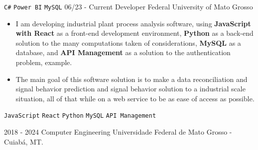 \documentclass[9pt]{developercv} %
\begin{document}
\begin{entrylist}
{        \texttt{C\#} \slashsep \texttt{Power BI} \slashsep \texttt{MySQL}}
        \entry
		{06/23 - Current}
		{\normalsize Developer}
		{\normalsize Federal University of Mato Grosso}
		{\vspace{-10pt}
        \vspace{2.5pt}
        \begin{itemize}[noitemsep,topsep=0pt,parsep=0pt,partopsep=0pt, leftmargin=-1pt]
            \item {I am developing industrial plant process analysis software, using \textbf{JavaScript with React} as a front-end development environment, \textbf{Python} as a back-end solution to the many computations taken of considerations, \textbf{MySQL} as a database, and \textbf{API Management} as a solution to the authentication problem, example.}
            \vspace{2.5pt}
            \item {The main goal of this software solution is to make a data reconciliation and signal behavior prediction and signal behavior solution to a industrial scale situation, all of that while on a web service to be as ease of access as possible.}
        \end{itemize} 
        \texttt{JavaScript} \slashsep \texttt{React} \slashsep \texttt{Python} \slashsep \texttt{MySQL} \slashsep \texttt{API Management}}
\end{entrylist}
\vspace{-10 pt}
\begin{entrylist}
    \entry
		{\normalsize 2018 - 2024}
		{\normalsize Computer Engineering}
		{\normalsize Universidade Federal de Mato Grosso - Cuiabá, MT.}
		{}
\end{entrylist}
\end{document}
